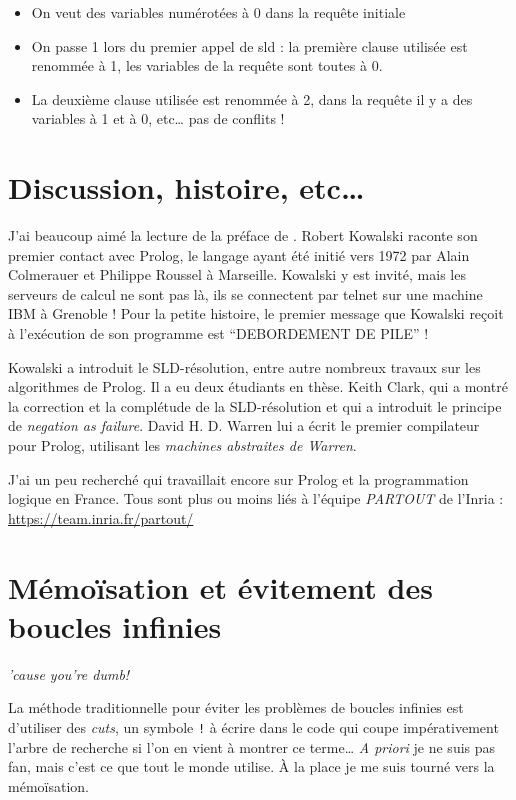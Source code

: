 \documentclass{article}
\begin{document}
\begin{itemize}
  \item
    On veut des variables numérotées à 0 dans la requête initiale
  \item
    On passe 1 lors du premier appel de sld : la première clause utilisée est renommée à 1, les variables de la requête sont toutes à 0.
  \item
    La deuxième clause utilisée est renommée à 2, dans la requête il y a des variables à 1 et à 0, etc\ldots{} pas de conflits !
\end{itemize}

\section{Discussion, histoire, etc\ldots{}}

J'ai beaucoup aimé la lecture de la préface de \cite{Sterling}. Robert Kowalski raconte son premier contact avec Prolog, le langage ayant été initié vers 1972 par Alain Colmerauer et Philippe Roussel à Marseille. Kowalski y est invité, mais les serveurs de calcul ne sont pas là, ils se connectent par telnet sur une machine IBM à Grenoble ! Pour la petite histoire, le premier message que Kowalski reçoit à l'exécution de son programme est ``DEBORDEMENT DE PILE'' !

Kowalski a introduit le SLD-résolution, entre autre nombreux travaux sur les algorithmes de Prolog. Il a eu deux étudiants en thèse. Keith Clark, qui a montré la correction et la complétude de la SLD-résolution et qui a introduit le principe de \emph{negation as failure}. David H. D. Warren lui a écrit le premier compilateur pour Prolog, utilisant les \emph{machines abstraites de Warren}.

J'ai un peu recherché qui travaillait encore sur Prolog et la programmation logique en France. Tous sont plus ou moins liés à l'équipe \emph{PARTOUT} de l'Inria : \url{https://team.inria.fr/partout/}

\section{Mémoïsation et évitement des boucles infinies}

\emph{'cause you're dumb!}

La méthode traditionnelle pour éviter les problèmes de boucles infinies est d'utiliser des \emph{cuts}, un symbole \texttt{!} à écrire dans le code qui coupe impérativement l'arbre de recherche si l'on en vient à montrer ce terme\ldots{} \emph{A priori} je ne suis pas fan, mais c'est ce que tout le monde utilise. À la place je me suis tourné vers la mémoïsation.
\end{document}
